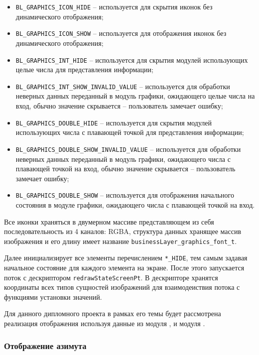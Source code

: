 \begin{itemize}
    \item \lstinline{BL_GRAPHICS_ICON_HIDE} -- используется для скрытия иконок без динамического отображения;
    \item \lstinline{BL_GRAPHICS_ICON_SHOW} -- используется для отображения иконок без динамического отображения;
    \item \lstinline{BL_GRAPHICS_INT_HIDE} -- используется для скрытия модулей использующих целые числа для представления информации;
    \item \lstinline{BL_GRAPHICS_INT_SHOW_INVALID_VALUE} -- используется для обработки неверных данных переданный в модуль графики, ожидающего целые числа на вход, обычно значение скрывается -- пользователь замечает ошибку;
    \item \lstinline{BL_GRAPHICS_DOUBLE_HIDE} -- используется для скрытия модулей использующих числа с плавающей точкой для представления информации;
    \item \lstinline{BL_GRAPHICS_DOUBLE_SHOW_INVALID_VALUE} -- используется для обработки неверных данных переданный в модуль графики, ожидающего числа с плавающей точкой на вход, обычно значение скрывается -- пользователь замечает ошибку;
    \item \lstinline{BL_GRAPHICS_DOUBLE_SHOW} -- используется для отображения начального состояния в модуле графики, ожидающего числа с плавающей точкой на вход.
\end{itemize}

Все иконки храняться в двумерном массиве представляющем из себя последовательность из 4 каналов: RGBA, структура данных хранящее массив изображения и его длину имеет название \lstinline{businessLayer_graphics_font_t}.

Далее инициализирует все элементы перечислением \lstinline{*_HIDE}, тем самым задавая начальное состояние для каждого элемента на экране.
После этого запускается поток с дескриптором \lstinline{redrawStateScreenPt}. В дескрипторе хранятся координаты всех типов сущностей изображений для взаимодеиствия потока
с функциями установки значений.

Для данного дипломного проекта в рамках его темы будет рассмотрена реализация отображения используя данные из модуля \moduleOrientationAzimuth, и модуля \moduleFindTarget .

\subsubsection{Отображение азимута}


